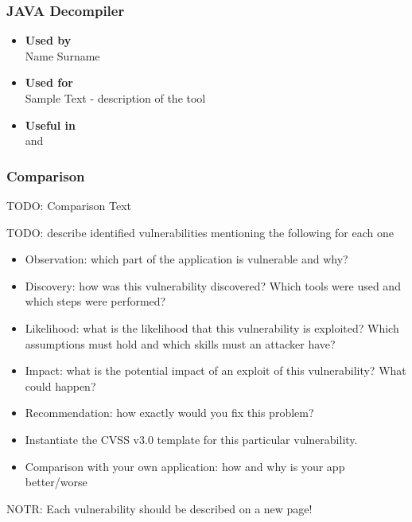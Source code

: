 \subsubsection*{JAVA Decompiler}
\begin{itemize}
	\item \textbf{Used by}\\ Name Surname
	\item \textbf{Used for}\\ Sample Text - description of the tool
	\item \textbf{Useful in}\\  and 
\end{itemize}

\subsubsection*{Comparison}
TODO: Comparison Text

\clearpage

TODO:\newline
describe identified vulnerabilities mentioning the following for each one
\begin{itemize}
	\item Observation: which part of the application is vulnerable and why?
	\item Discovery: how was this vulnerability discovered? Which tools were used and which steps were performed?
	\item Likelihood: what is the likelihood that this vulnerability is exploited? Which assumptions must hold and which skills must an attacker have?
	\item Impact: what is the potential impact of an exploit of this vulnerability? What could happen?
	\item Recommendation: how exactly would you fix this problem?
	\item Instantiate the CVSS v3.0 template for this particular vulnerability.
	\item Comparison with your own application: how and why is your app better/worse
\end{itemize}

NOTR: Each vulnerability should be described on a new page!\newline


